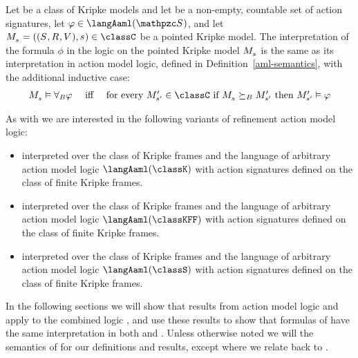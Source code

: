 \begin{definition}
Let \classC{} be a class of Kripke models and let \aSignatureFamily{} be a non-empty, countable set of action signatures, let $\phi \in \langAaml(\aSignatureFamily)$, and let $\kPModelAndTuple{\kStateS} \in \classC$ be a pointed Kripke model.
The interpretation of the formula $\phi$ in the logic \logicRamlC{} on the pointed Kripke model $\kPModel{\kStateS}$ is the same as its interpretation in action model logic, defined in Definition~\ref{aml-semantics}, with the additional inductive case:
$$
\begin{array}{lcl}
    \kPModel{\kStateS} \entails \allactsBs \phi & \text{ iff } & \text{for every } \kPModelP{\kStateSP} \in \classC \text{ if } \kPModel{\kStateS} \simulatesBs \kPModelP{\kStateSP} \text{ then } \kPModelP{\kStateSP} \entails \phi
\end{array}
$$
\end{definition}

As with \logicAaml{} we are interested in the following variants of refinement action model logic:
\begin{itemize}
    \item \logicRamlK{} interpreted over the class of \classK{} Kripke frames and the language of arbitrary action model logic $\langAaml(\classK)$ with action signatures defined on the class of finite \classK{} Kripke frames.
    \item \logicRamlKFF{} interpreted over the class of \classKFF{} Kripke frames and the language of arbitrary action model logic $\langAaml(\classKFF)$ with action signatures defined on the class of finite \classKFF{} Kripke frames.
    \item \logicRamlS{} interpreted over the class of \classS{} Kripke frames and the language of arbitrary action model logic $\langAaml(\classS)$ with action signatures defined on the class of finite \classS{} Kripke frames.
\end{itemize}

In the following sections we will show that results from action model logic and \logicRml{} apply to the combined logic \logicRaml{}, and use these results to show that formulas of \langAaml{} have the same interpretation in both \logicAaml{} and \logicRaml{}.
Unless otherwise noted we will the semantics of \logicRaml{} for our definitions and results, except where we relate \logicRaml{} back to \logicAaml{}.

\pagebreak
